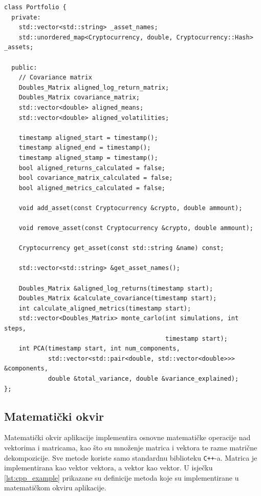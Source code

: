 \documentclass[zavrsnirad, upload]{fer}
\begin{document}
\begin{lstlisting}[caption={Model portfelja}, label={lst:portfelj}]
class Portfolio {
  private:
    std::vector<std::string> _asset_names;
    std::unordered_map<Cryptocurrency, double, Cryptocurrency::Hash> _assets;

  public:
    // Covariance matrix
    Doubles_Matrix aligned_log_return_matrix;
    Doubles_Matrix covariance_matrix;
    std::vector<double> aligned_means;
    std::vector<double> aligned_volatilities;

    timestamp aligned_start = timestamp();
    timestamp aligned_end = timestamp();
    timestamp aligned_stamp = timestamp();
    bool aligned_returns_calculated = false;
    bool covariance_matrix_calculated = false;
    bool aligned_metrics_calculated = false;

    void add_asset(const Cryptocurrency &crypto, double ammount);

    void remove_asset(const Cryptocurrency &crypto, double ammount);

    Cryptocurrency get_asset(const std::string &name) const;

    std::vector<std::string> &get_asset_names();

    Doubles_Matrix &aligned_log_returns(timestamp start);
    Doubles_Matrix &calculate_covariance(timestamp start);
    int calculate_aligned_metrics(timestamp start);
    std::vector<Doubles_Matrix> monte_carlo(int simulations, int steps,
                                            timestamp start);
    int PCA(timestamp start, int num_components,
            std::vector<std::pair<double, std::vector<double>>> &components,
            double &total_variance, double &variance_explained);
};
\end{lstlisting}

\subsection{Matematički okvir}
\label{sek:matematicki_okvir}
Matematički okvir aplikacije implementira osnovne matematičke
operacije nad vektorima i matricama, kao što su množenje
matrica i vektora te razne matrične dekompozicije. Sve metode koriste
samo standardnu biblioteku \texttt{C++}-a. Matrica je implementirana
kao vektor vektora, a vektor kao vektor.
U isječku \ref{lst:cpp_example} prikazane su definicije metoda koje
su implementirane u matematičkom okviru aplikacije.
\end{document}
